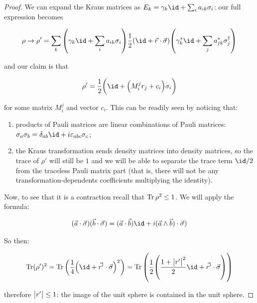 \documentclass[main.tex]{subfiles}
\begin{document}
\begin{bluebox}
\begin{proof}
We can expand the Kraus matrices as \(E_k = \gamma_k \id + \sum _{i} a_{ik} \sigma_i \): our full expression becomes

\begin{equation}
    \rho \rightarrow \rho' =
    \sum _{k}
    \qty(\gamma_k \id + \sum _{i} a_{ik} \sigma_i)
    \frac{1}{2} \qty(\id + \vec{r} \cdot \vec{\sigma})
    \qty(\gamma_k^* \id + \sum _{j} a_{jk}^* \sigma_j ^\dag)
\end{equation}

and our claim is that

\begin{equation}
    \rho' =
    \frac{1}{2} \qty(\id + \qty(M_i^j r_j + c_i) \sigma_i)
\end{equation}

for some matrix \(M_i^j\) and vector \(c_i\).
This can be readily seen by noticing that:

\begin{enumerate}
    \item products of Pauli matrices are linear combinations of Pauli matrices: \(\sigma_a \sigma_b = \delta_{ab} \id + i \varepsilon_{abc} \sigma_c\);
    \item the Kraus transformation sends density matrices into density matrices, so the trace of \(\rho'\) will still be \(1\) and we will be able to separate the trace term \(\id/2\) from the traceless Pauli matrix part (that is, there will not be any transformation-dependents coefficients multiplying the identity).
\end{enumerate}

Now, to see that it is a contraction recall that \(\operatorname*{Tr} \rho^2 \leq 1\). We will apply the formula:

\begin{equation}
(\vec{a} \cdot \vec{\sigma}) (\vec{b} \cdot \vec{\sigma}) = (\vec{a} \cdot \vec{b}) \id  + i (\vec{a} \wedge \vec{b}) \cdot \vec{\sigma})
\end{equation}

So then:

\begin{equation}
    \Tr (\rho')^2 =
    \Tr \qty( \frac{1}{4} \qty(\id + \vec{r'} \cdot \vec{\sigma})^2)
    = \Tr\qty( \frac{1}{2} \qty(\frac{1 + \abs{r'}^2 }{2} \id + \vec{r'} \cdot \vec{\sigma}))
\end{equation}

therefore \(\abs{r'} \leq 1\): the image of the unit sphere is contained in the unit sphere.
\end{proof}
\end{bluebox}
\end{document}
